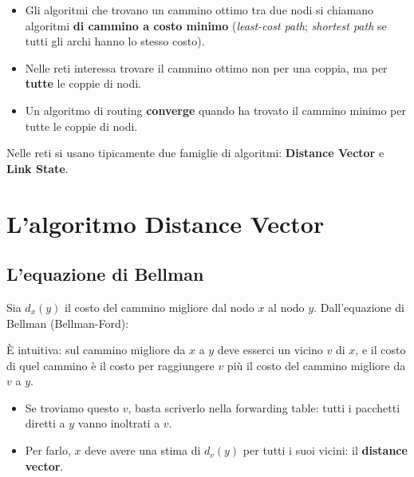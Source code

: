 \begin{itemize}
    \item Gli algoritmi che trovano un cammino ottimo tra due nodi si chiamano algoritmi \textbf{di cammino a costo minimo}
          (\emph{least-cost path}; \emph{shortest path} se tutti gli archi hanno lo stesso costo).
    \item Nelle reti interessa trovare il cammino ottimo non per una coppia, ma per \textbf{tutte} le coppie di nodi.
    \item Un algoritmo di routing \textbf{converge} quando ha trovato il cammino minimo per tutte le coppie di nodi.
\end{itemize}

Nelle reti si usano tipicamente due famiglie di algoritmi: \textbf{Distance Vector} e \textbf{Link State}.

\section{L'algoritmo Distance Vector}


\subsection{L'equazione di Bellman}

Sia $d_x(y)$ il costo del cammino migliore dal nodo $x$ al nodo $y$. Dall'equazione di Bellman (Bellman-Ford):


È intuitiva: sul cammino migliore da $x$ a $y$ deve esserci un vicino $v$ di $x$, e il costo di quel cammino è il costo per
raggiungere $v$ più il costo del cammino migliore da $v$ a $y$.

\begin{itemize}
    \item Se troviamo questo $v$, basta scriverlo nella forwarding table: tutti i pacchetti diretti a $y$ vanno inoltrati a $v$.
    \item Per farlo, $x$ deve avere una stima di $d_v(y)$ per tutti i suoi vicini: il \textbf{distance vector}.
\end{itemize}

